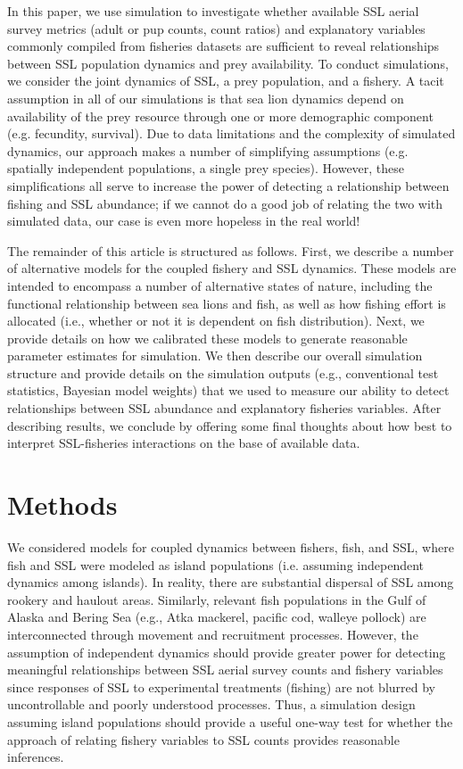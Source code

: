 \documentclass[nonumbib,leqno]{nrc1}
\begin{document}
In this paper, we use simulation to investigate whether available SSL aerial survey metrics (adult or pup counts, count ratios) and explanatory variables commonly compiled from fisheries datasets are sufficient to reveal relationships between SSL population dynamics and prey availability. To conduct simulations, we consider the joint dynamics of SSL, a prey population, and a fishery.  A tacit assumption in all of our simulations is that sea lion dynamics depend on availability of the prey resource through one or more demographic component (e.g. fecundity, survival).  Due to data limitations and the complexity of simulated dynamics, our approach makes a number of simplifying assumptions (e.g. spatially independent populations, a single prey species).  However, these simplifications all serve to increase the power of detecting a relationship between fishing and SSL abundance; if we cannot do a good job of relating the two with simulated data, our case is even more hopeless in the real world!

The remainder of this article is structured as follows.  First, we describe a number of alternative models for the coupled fishery and SSL dynamics.  These models are intended to encompass a number of
alternative states of nature, including the functional relationship between sea lions and fish, as well as
how fishing effort is allocated (i.e., whether or not it is dependent on fish distribution).  Next, we provide details on how we calibrated these models to generate reasonable parameter estimates for simulation.  We then describe our overall simulation structure and provide details on the simulation outputs (e.g., conventional test statistics, Bayesian model weights) that we used to measure our ability to detect relationships between SSL abundance and explanatory fisheries variables.  After describing results, we conclude by offering some final thoughts about how best to interpret SSL-fisheries interactions on the base of available data.


\section{Methods}

We considered models for coupled dynamics between fishers, fish, and SSL, where fish and SSL were modeled as island populations (i.e. assuming independent dynamics among islands).  In reality, there are substantial dispersal of SSL among rookery and haulout areas.  Similarly, relevant fish populations in the Gulf of Alaska and Bering Sea (e.g., Atka mackerel, pacific cod, walleye pollock) are interconnected through movement and recruitment processes.  However, the assumption of independent dynamics should provide greater power for detecting meaningful relationships between SSL aerial survey counts and fishery variables since responses of SSL to experimental treatments (fishing) are not blurred by uncontrollable and poorly understood processes.  Thus, a simulation design assuming island populations should provide a useful one-way test for whether the approach of relating fishery variables to SSL counts provides reasonable inferences.
\end{document}
